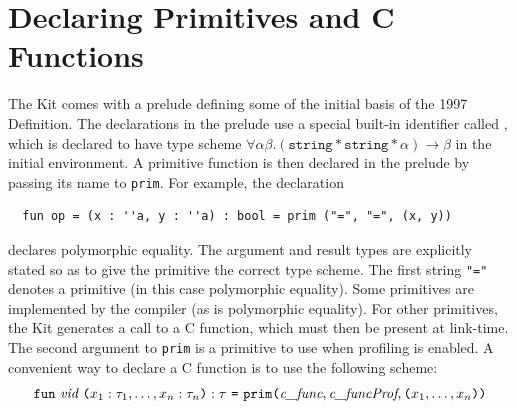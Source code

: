 \documentclass[12pt]{book}
\begin{document}
\section{Declaring Primitives and C Functions}
\label{parPassing.sec}
The Kit comes with a prelude defining some of the initial basis of the
1997 Definition.  The declarations in the prelude use a special
built-in identifier called , which is
declared to have type scheme $\forall \alpha \beta .  (\texttt{string}
\ast \texttt{string} \ast \alpha) \rightarrow \beta$ in the initial
environment.  A primitive function is then declared in the prelude by
passing its name to \texttt{prim}.  For example, the declaration
\begin{verbatim}
  fun op = (x : ''a, y : ''a) : bool = prim ("=", "=", (x, y))
\end{verbatim}
\noindent
declares polymorphic equality.  The argument and result types are
explicitly stated so as to give the primitive the correct type
scheme. The first string {\tt "="} denotes a primitive (in this case
polymorphic equality). Some primitives are implemented by the compiler
(as is polymorphic equality). For other primitives, the Kit generates
a call to a C function, which must then be present at link-time. The
second argument to {\tt prim} is a primitive to use when profiling is
enabled. A convenient way to declare a C function is to use the
following scheme:
$$\texttt{fun}~ \emph{vid} ~\texttt{(}x_1:\tau_1, \ldots, x_n:\tau_n\texttt{)}
    : \tau ~\texttt{=} ~\texttt{prim(}\emph{c\_func}, \emph{c\_funcProf}, \texttt{(}
  x_1, \ldots, x_n\texttt{)} \texttt{)}
$$
\end{document}
